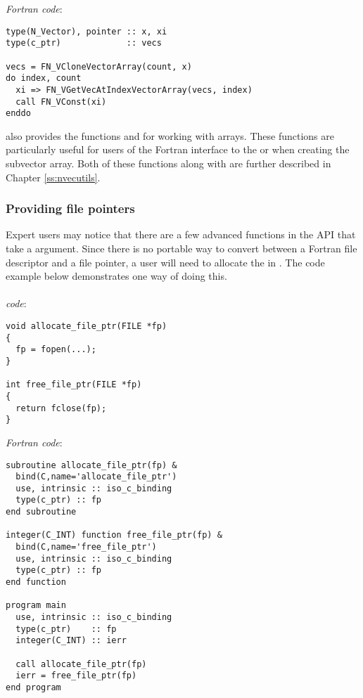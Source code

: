 \noindent \emph{Fortran code}:
\begin{verbatim}
type(N_Vector), pointer :: x, xi
type(c_ptr)             :: vecs

vecs = FN_VCloneVectorArray(count, x)
do index, count
  xi => FN_VGetVecAtIndexVectorArray(vecs, index)
  call FN_VConst(xi)
enddo
\end{verbatim}

{\sundials} also provides the functions  and
 for working with  arrays. These functions
are particularly useful for users of the Fortran interface to the
{\nvecmanyvector} or {\nvecmpimanyvector} when creating the subvector array.
Both of these functions along with  are further
described in Chapter \ref{ss:nvecutils}.

\subsubsection{Providing file pointers}

Expert {\sundials} users may notice that there are a few advanced functions in the {\sundials}
{\CC} API that take a  argument. Since there is no portable way to convert between
a Fortran file descriptor and a {\CC} file pointer, a user will need to allocate the
 in {\CC}. The code example below demonstrates one way of doing this.
\\
\\
\noindent \emph{{\CC} code}:
\begin{verbatim}
void allocate_file_ptr(FILE *fp)
{
  fp = fopen(...);
}

int free_file_ptr(FILE *fp)
{
  return fclose(fp);
}
\end{verbatim}

\noindent \emph{Fortran code}:
\begin{verbatim}
subroutine allocate_file_ptr(fp) &
  bind(C,name='allocate_file_ptr')
  use, intrinsic :: iso_c_binding
  type(c_ptr) :: fp
end subroutine

integer(C_INT) function free_file_ptr(fp) &
  bind(C,name='free_file_ptr')
  use, intrinsic :: iso_c_binding
  type(c_ptr) :: fp
end function

program main
  use, intrinsic :: iso_c_binding
  type(c_ptr)    :: fp
  integer(C_INT) :: ierr

  call allocate_file_ptr(fp)
  ierr = free_file_ptr(fp)
end program
\end{verbatim}

